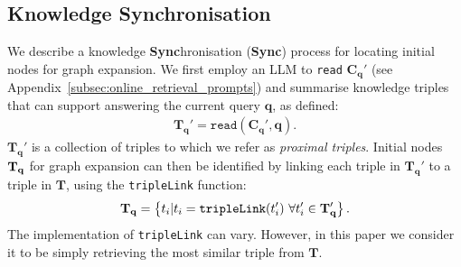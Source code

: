 \subsection{Knowledge Synchronisation}
\label{subsection:knowledge_syncro}
\def\linkTriple{\texttt{tripleLink}}

We describe a knowledge \textbf{Sync}hronisation (\textbf{Sync}) process for locating initial nodes for graph expansion. We first employ an LLM to \texttt{read} $\mathbf{C}_\mathbf{q}'$ (see Appendix~\ref{subsec:online_retrieval_prompts}) and summarise knowledge triples that can support answering the current query $\mathbf{q}$, as defined:
\begin{align}
    \mathbf{T}_\mathbf{q}' = \texttt{read}\left (\mathbf{C}_\mathbf{q}', \mathbf{q}\right ).
    \label{eq:proximal_read}
\end{align}
$\mathbf{T}_\mathbf{q}'$ is a collection of triples to which we refer as \textit{proximal triples}. Initial nodes $\mathbf{T}_\mathbf{q}$ for graph expansion can then be identified by linking each triple in $\mathbf{T}_\mathbf{q}'$ to a triple in $\mathbf{T}$, using the \linkTriple{} function:
\begin{align}
    \Tqinit =\left \{t_i | t_i = \linkTriple(t_i') ~ \forall t_i' \in \mathbf{T}_\mathbf{q}'\right \}.
\end{align}
The implementation of \linkTriple{} can vary. However, in this paper we consider it to be simply retrieving the most similar triple from $\mathbf{T}$.




